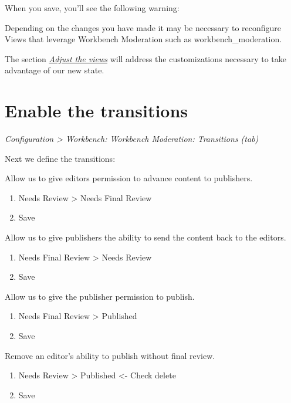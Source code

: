 \documentclass[letterpaper,10pt,english]{sphinxmanual}
\begin{document}
When you save, you'll see the following warning:

Depending on the changes you have made it may be necessary to reconfigure Views that leverage Workbench Moderation such as workbench\_moderation.

The section {\hyperref[moderation:views]{\emph{Adjust the views}}} will address the customizations necessary to take advantage of our new state.


\section{Enable the transitions}
\label{moderation:enable-the-transitions}
\emph{Configuration \textgreater{} Workbench: Workbench Moderation: Transitions (tab)}

Next we define the transitions:

Allow us to give editors permission to advance content to publishers.
\begin{enumerate}
\item {} 
Needs Review \textgreater{} Needs Final Review

\item {} 
Save

\end{enumerate}

Allow us to give publishers the ability to send the content back to the editors.
\begin{enumerate}
\item {} 
Needs Final Review \textgreater{} Needs Review

\item {} 
Save

\end{enumerate}

Allow us to give the publisher permission to publish.
\begin{enumerate}
\item {} 
Needs Final Review \textgreater{} Published

\item {} 
Save

\end{enumerate}

Remove an editor's ability to publish without final review.
\begin{enumerate}
\item {} 
Needs Review \textgreater{} Published \textless{}- Check delete

\item {} 
Save

\end{enumerate}
\end{document}
